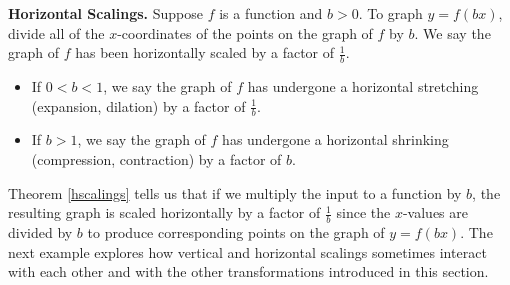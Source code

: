 \colorbox{ResultColor}{\bbm


\begin{thm} \label{hscalings}\textbf{Horizontal Scalings.}  Suppose $f$ is a function and $b>0$.  To graph $y= f(bx)$, divide all of the $x$-coordinates of the points on the graph of $f$ by $b$. We say the graph of $f$ has been horizontally scaled by a factor of $\frac{1}{b}$. 

\begin{itemize}

\item If $0 < b < 1$, we say the graph of $f$ has undergone a horizontal stretching (expansion, dilation) by a factor of $\frac{1}{b}$. 

\item If $b>1$, we say the graph of $f$ has undergone a horizontal shrinking (compression, contraction) by a factor of $b$.

\end{itemize}

\end{thm}

\ebm}

\smallskip

Theorem \ref{hscalings} tells us that if we multiply the input to a function by $b$, the resulting graph is scaled horizontally by a factor of $\frac{1}{b}$ since the $x$-values are divided by $b$ to produce corresponding points on the graph of $y = f(bx)$.    The next example explores how vertical and horizontal scalings sometimes interact with each other and with the other transformations introduced in this section. 

